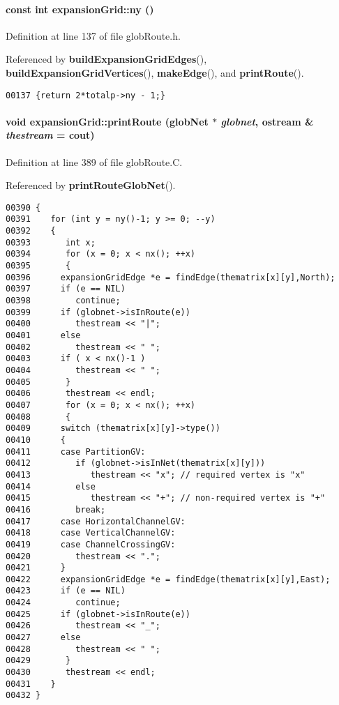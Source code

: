 \paragraph{\setlength{\rightskip}{0pt plus 5cm}const int expansion\-Grid::ny ()\hspace{0.3cm}{\tt  [inline]}}\hfill



Definition at line 137 of file glob\-Route.h.

Referenced by {\bf build\-Expansion\-Grid\-Edges}(), {\bf build\-Expansion\-Grid\-Vertices}(), {\bf make\-Edge}(), and {\bf print\-Route}().\small\begin{verbatim}00137 {return 2*totalp->ny - 1;}
\end{verbatim}\normalsize 
\label{expansionGrid_a10}
\paragraph{\setlength{\rightskip}{0pt plus 5cm}void expansion\-Grid::print\-Route ({\bf glob\-Net} $\ast$ {\em globnet}, ostream \& {\em thestream} = cout)}\hfill



Definition at line 389 of file glob\-Route.C.

Referenced by {\bf print\-Route\-Glob\-Net}().\small\begin{verbatim}00390 {
00391    for (int y = ny()-1; y >= 0; --y)
00392    {
00393       int x;
00394       for (x = 0; x < nx(); ++x)
00395       {
00396      expansionGridEdge *e = findEdge(thematrix[x][y],North);
00397      if (e == NIL)
00398         continue;
00399      if (globnet->isInRoute(e))
00400         thestream << "|";
00401      else
00402         thestream << " ";
00403      if ( x < nx()-1 )
00404         thestream << " ";
00405       }
00406       thestream << endl;
00407       for (x = 0; x < nx(); ++x)
00408       {
00409      switch (thematrix[x][y]->type())
00410      {
00411      case PartitionGV:
00412         if (globnet->isInNet(thematrix[x][y]))
00413            thestream << "x"; // required vertex is "x"
00414         else
00415            thestream << "+"; // non-required vertex is "+"
00416         break;
00417      case HorizontalChannelGV:
00418      case VerticalChannelGV:
00419      case ChannelCrossingGV:
00420         thestream << ".";
00421      }
00422      expansionGridEdge *e = findEdge(thematrix[x][y],East);
00423      if (e == NIL)
00424         continue;
00425      if (globnet->isInRoute(e))
00426         thestream << "_";
00427      else
00428         thestream << " ";
00429       }
00430       thestream << endl;
00431    }
00432 }
\end{verbatim}\normalsize 
\label{expansionGrid_c7}
